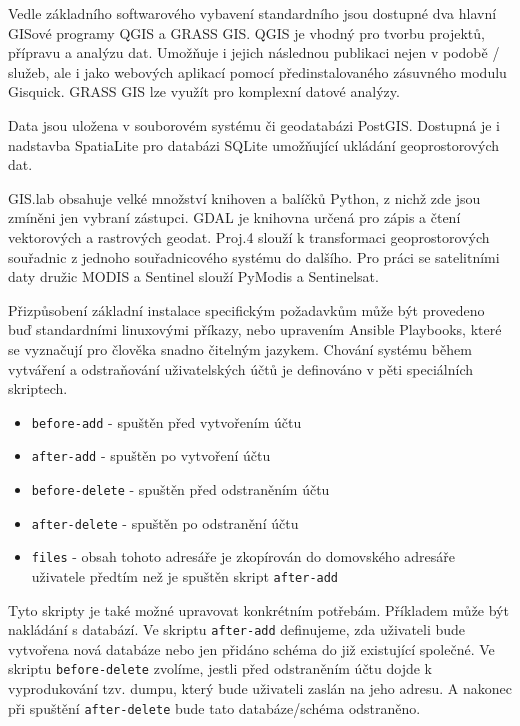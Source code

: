 Vedle základního softwarového vybavení standardního  jsou dostupné dva hlavní GISové programy QGIS a GRASS GIS. QGIS je vhodný pro tvorbu projektů, přípravu a analýzu dat. Umožňuje i jejich následnou publikaci nejen v podobě / služeb, ale i jako webových aplikací pomocí předinstalovaného zásuvného modulu Gisquick. GRASS GIS lze využít pro komplexní datové analýzy. 

Data jsou uložena v souborovém systému či geodatabázi PostGIS. Dostupná je i nadstavba SpatiaLite pro databázi SQLite umožňující ukládání geoprostorových dat. 

GIS.lab obsahuje velké množství knihoven a balíčků Python, z nichž zde jsou zmíněni jen vybraní zástupci. GDAL je knihovna určená pro zápis a čtení vektorových a rastrových geodat. Proj.4 slouží k transformaci geoprostorových souřadnic z jednoho souřadnicového systému do dalšího. Pro práci se satelitními daty družic MODIS a Sentinel slouží PyModis a Sentinelsat.

Přizpůsobení základní instalace specifickým požadavkům může být provedeno buď standardními linuxovými příkazy, nebo upravením Ansible Playbooks, které se vyznačují pro člověka snadno čitelným jazykem. Chování systému během vytváření a odstraňování uživatelských účtů je definováno v pěti speciálních skriptech. 
\begin{itemize}
\item \texttt{before-add} - spuštěn před vytvořením účtu
\item \texttt{after-add} - spuštěn po vytvoření účtu
\item \texttt{before-delete} - spuštěn před odstraněním účtu
\item \texttt{after-delete} - spuštěn po odstranění účtu
\item \texttt{files} - obsah tohoto adresáře je zkopírován do domovského adresáře uživatele předtím než je spuštěn skript \texttt{after-add}
\end{itemize}
Tyto skripty je také možné upravovat konkrétním potřebám. Příkladem může být nakládání s databází. Ve skriptu \texttt{after-add} definujeme, zda uživateli bude vytvořena nová databáze nebo jen přidáno schéma do již existující společné. Ve skriptu \texttt{before-delete} zvolíme, jestli před odstraněním účtu dojde k vyprodukování tzv. dumpu, který bude uživateli zaslán na jeho adresu. A nakonec při spuštění \texttt{after-delete} bude tato databáze/schéma odstraněno.

